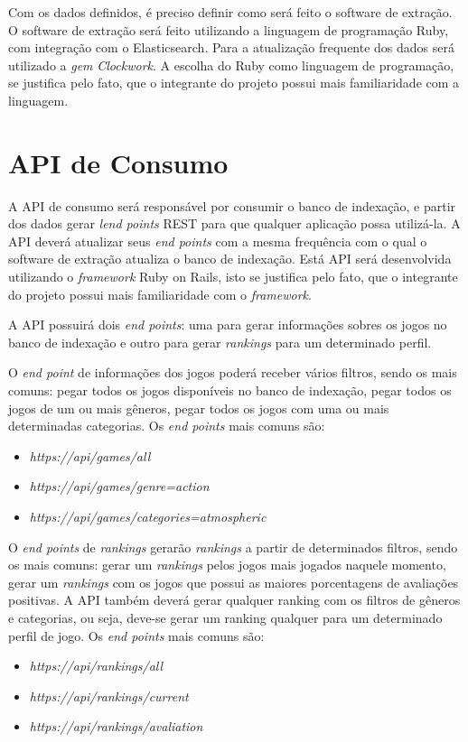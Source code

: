 Com os dados definidos, é preciso definir como será feito o software de extração. O software de extração será feito utilizando a linguagem de programação Ruby, com integração com o Elasticsearch. Para a atualização frequente dos dados será utilizado a \textit{gem} \textit{Clockwork}. A escolha do Ruby como linguagem de programação, se justifica pelo fato, que o integrante do projeto possui mais familiaridade com a linguagem.
\section{API de Consumo}
A API de consumo será responsável por consumir o banco de indexação, e partir dos dados gerar \textit{lend points} REST para que qualquer aplicação possa utilizá-la. A API deverá atualizar seus \textit{end points} com a mesma frequência com o qual o software de extração atualiza o banco de indexação. Está API será desenvolvida utilizando o \textit{framework} Ruby on Rails, isto se justifica pelo fato, que o integrante do projeto possui mais familiaridade com o \textit{framework}.

A API possuirá dois \textit{end points}: uma para gerar informações sobres os jogos no banco de indexação e outro para gerar \textit{rankings} para um determinado perfil.

O \textit{end point} de informações dos jogos poderá receber vários filtros, sendo os mais comuns: pegar todos os jogos disponíveis no banco de indexação, pegar todos os jogos de um ou mais gêneros, pegar todos os jogos com uma ou mais determinadas categorias. Os \textit{end points} mais comuns são:
\begin{itemize}
	\item \textit{https://api/games/all}
	\item \textit{https://api/games/genre=action}
	\item \textit{https://api/games/categories=atmospheric}
\end{itemize}
O \textit{end points} de \textit{rankings} gerarão \textit{rankings} a partir de determinados filtros, sendo os mais comuns: gerar um \textit{rankings} pelos jogos mais jogados naquele momento, gerar um \textit{rankings} com os jogos que possui as maiores porcentagens de avaliações positivas. A API também deverá gerar qualquer ranking com os filtros de gêneros e categorias, ou seja, deve-se gerar um ranking qualquer para um determinado perfil de jogo. Os \textit{end points} mais comuns são:
\begin{itemize}
	\item \textit{https://api/rankings/all}
	\item \textit{https://api/rankings/current}
	\item \textit{https://api/rankings/avaliation}
\end{itemize}

